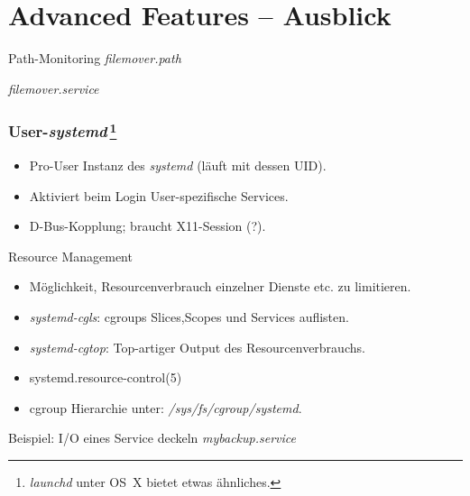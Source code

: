 \section[Advanced]{Advanced Features – Ausblick}

\begin{frame}{Path-Monitoring}
\emph{filemover.path}
\footnotesize


{\normalsize\emph{filemover.service}}


\end{frame}


\begin{frame}
\frametitle{User-\emph{systemd}\,\footnote{\emph{launchd} unter OS~X
bietet etwas ähnliches.}}
\begin{itemize}
\item Pro-User Instanz des \emph{systemd} (läuft mit dessen UID).
\item Aktiviert beim Login User-spezifische Services.
\item D-Bus-Kopplung; braucht X11-Session (?).
\end{itemize}
\end{frame}


\begin{frame}{Resource Management}
\begin{itemize}
\item Möglichkeit, Resourcenverbrauch einzelner Dienste etc. zu limitieren.
\item \emph{systemd-cgls}: cgroups Slices,Scopes und Services auflisten.
\item \emph{systemd-cgtop}: Top-artiger Output des Resourcenverbrauchs.
\item systemd.resource-control(5)
\item cgroup Hierarchie unter: \emph{/sys/fs/cgroup/systemd}.
\end{itemize}
\end{frame}


\begin{frame}{Beispiel: I/O eines Service deckeln}
\emph{mybackup.service}
\footnotesize

\end{frame}

